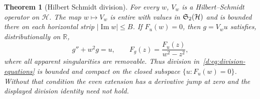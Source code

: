 \documentclass[11pt,a4paper]{article}
\numberwithin{equation}{section}
\newtheorem{theorem}{Theorem}[section]
\theoremstyle{definition}\newtheorem{definition}[theorem]{Definition}
\theoremstyle{remark}\newtheorem{remark}[theorem]{Remark}
\newcommand{\R}{\mathbb R}\newcommand{\C}{\mathbb C}\newcommand{\N}{\mathbb N}
\newcommand{\Hh}{\mathcal H}\newcommand{\Hw}{\mathcal H}
\begin{document}
\begin{theorem}[Hilbert Schmidt division]\label{d:thm:division}
For every $w$, $V_w$ is a Hilbert--Schmidt operator on $\Hh$. The map $w\mapsto V_w$ is entire with values in $\HS(\Hh)$ and is bounded there on each horizontal strip $|\operatorname{Im}w|\le B$. If $F_u(w)=0$, then $g=V_wu$ satisfies, distributionally on $\R$,
\begin{equation}\label{d:eq:division-equations}
 g''+w^2g=u,\qquad
 F_g(z)=\frac{F_u(z)}{w^2-z^2},
\end{equation}
where all apparent singularities are removable. Thus division in~\eqref{d:eq:division-equations} is bounded and compact on the closed subspace $\{u:F_u(w)=0\}$. Without that condition the even extension has a derivative jump at zero and the displayed division identity need not hold.
\end{theorem}
\end{document}
